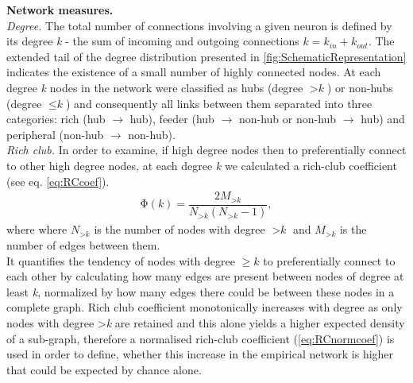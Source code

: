 \documentclass[10pt,letterpaper]{article}
\begin{document}
\textbf{Network measures.} \\
\textit{Degree.} The total number of connections involving a given neuron is defined by its degree \textit{k} - the sum of incoming and outgoing connections $k=k_{in} + k_{out} $. 
The extended tail of the degree distribution presented in \ref{fig:SchematicRepresentation} indicates the existence of a small number of highly connected nodes. 
At each degree \textit{k} nodes in the network were classified as hubs (degree $>\textit{k}$) or non-hubs (degree $\leq\textit{k}$) and consequently all links between them separated into three categories: rich (hub $\rightarrow$ hub), feeder (hub $\rightarrow$ non-hub or non-hub $\rightarrow$ hub) and peripheral (non-hub $\rightarrow$ non-hub). \\
\textit{Rich club.} In order to examine, if high degree nodes then to preferentially connect to other high degree nodes, at each degree \textit{k} we calculated a rich-club coefficient (see eq. \ref{eq:RCcoef}).  
 	\begin{eqnarray}
	\label{eq:RCcoef}
     \mathrm{\Phi(\textit{k})} = \dfrac{2M_{>\textit{k}}}{N_{>\textit{k}}(N_{>\textit{k}}-1)}, 
	 \end{eqnarray}
where where $N_{>\textit{k}}$ is the number of nodes with degree $>\textit{k}$ and $M_{>\textit{k}}$ is the number of edges between them. \\
It quantifies the tendency of nodes with degree $\geq k$ to preferentially connect to each other by calculating how many edges are present between nodes of degree at least \textit{k}, normalized by how many edges there could be between these nodes in a complete graph.  
Rich club coefficient monotonically increases with degree as only nodes with degree >\textit{k} are retained and this alone yields a higher expected density of a sub-graph, therefore a normalised rich-club coefficient (\ref{eq:RCnormcoef}) is used in order to define, whether this increase in the empirical network is higher that could be expected by chance alone.  
\end{document}
